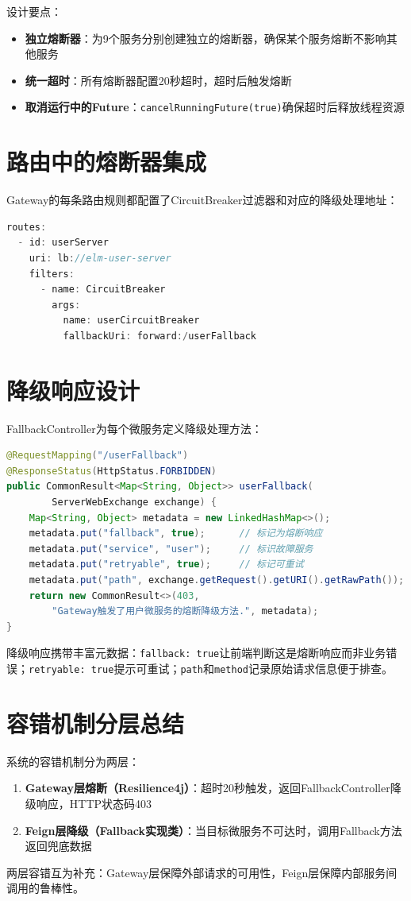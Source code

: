 设计要点：
\begin{itemize}
	\item \textbf{独立熔断器}：为9个服务分别创建独立的熔断器，确保某个服务熔断不影响其他服务
	\item \textbf{统一超时}：所有熔断器配置20秒超时，超时后触发熔断
	\item \textbf{取消运行中的Future}：\verb|cancelRunningFuture(true)|确保超时后释放线程资源
\end{itemize}

\section{路由中的熔断器集成}

Gateway的每条路由规则都配置了CircuitBreaker过滤器和对应的降级处理地址：

\begin{lstlisting}[language=Java, caption=路由中的熔断器配置]
routes:
  - id: userServer
    uri: lb://elm-user-server
    filters:
      - name: CircuitBreaker
        args:
          name: userCircuitBreaker
          fallbackUri: forward:/userFallback
\end{lstlisting}

\section{降级响应设计}

FallbackController为每个微服务定义降级处理方法：

\begin{lstlisting}[language=Java, caption=FallbackController降级响应]
@RequestMapping("/userFallback")
@ResponseStatus(HttpStatus.FORBIDDEN)
public CommonResult<Map<String, Object>> userFallback(
        ServerWebExchange exchange) {
    Map<String, Object> metadata = new LinkedHashMap<>();
    metadata.put("fallback", true);      // 标记为熔断响应
    metadata.put("service", "user");     // 标识故障服务
    metadata.put("retryable", true);     // 标记可重试
    metadata.put("path", exchange.getRequest().getURI().getRawPath());
    return new CommonResult<>(403,
        "Gateway触发了用户微服务的熔断降级方法.", metadata);
}
\end{lstlisting}

降级响应携带丰富元数据：\verb|fallback: true|让前端判断这是熔断响应而非业务错误；\verb|retryable: true|提示可重试；\verb|path|和\verb|method|记录原始请求信息便于排查。

\section{容错机制分层总结}

系统的容错机制分为两层：
\begin{enumerate}
	\item \textbf{Gateway层熔断（Resilience4j）}：超时20秒触发，返回FallbackController降级响应，HTTP状态码403
	\item \textbf{Feign层降级（Fallback实现类）}：当目标微服务不可达时，调用Fallback方法返回兜底数据
\end{enumerate}

两层容错互为补充：Gateway层保障外部请求的可用性，Feign层保障内部服务间调用的鲁棒性。
